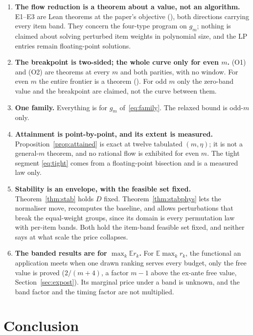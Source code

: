 \begin{enumerate}
\item[1)] \textbf{The flow reduction is a theorem about a value, not an algorithm.} E1--E3
are Lean theorems at the paper's objective (), both directions carrying
every item band. They concern the four-type program on $g_{m}$; nothing is claimed about
solving perturbed item weights in polynomial size, and the LP entries remain floating-point
solutions.
\item[2)] \textbf{The breakpoint is two-sided; the whole curve only for even $m$.} (O1) and
(O2) are theorems at every $m$ and both parities, with no window. For even $m$ the entire
frontier is a theorem (). For odd $m$ only the zero-band value and
the breakpoint are claimed, not the curve between them.
\item[3)] \textbf{One family.} Everything is for $g_{m}$ of~\eqref{eq:family}. The relaxed
bound is odd-$m$ only.
\item[6)] \textbf{Attainment is point-by-point, and its extent is measured.}
Proposition~\ref{prop:attained} is exact at twelve tabulated $(m,\eta)$; it is not a
general-$m$ theorem, and no rational flow is exhibited for even $m$. The tight segment
\eqref{eq:tight} comes from a floating-point bisection and is a measured law only.
\item[4)] \textbf{Stability is an envelope, with the feasible set fixed.}
Theorem~\ref{thm:stab} holds $D$ fixed. Theorem~\ref{thm:stabphys} lets the normaliser move,
recomputes the baseline, and allows perturbations that break the equal-weight groups, since
its domain is every permutation law with per-item bands. Both hold the item-band feasible set
fixed, and neither says at what scale the price collapses.
\item[5)] \textbf{The banded results are for $\max_{k}\mathbb{E}r_{k}$.} For
$\mathbb{E}\max_{k}r_{k}$, the functional an application meets when one drawn ranking serves
every budget, only the free value is proved ($2/(m+4)$, a factor $m-1$ above the ex-ante
free value, Section~\ref{sec:expost}). Its marginal price under a band is unknown, and the
band factor and the timing factor are not multiplied.
\end{enumerate}

\section{Conclusion}

